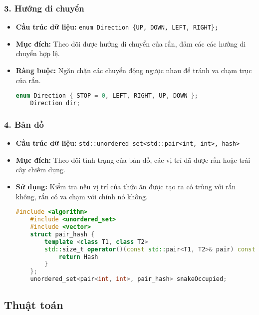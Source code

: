 \documentclass[12pt]{report}
\begin{document}
\subsubsection*{3. Hướng di chuyển}
\begin{itemize}
    \item \textbf{Cầu trúc dữ liệu:} \texttt{enum Direction \{UP, DOWN, LEFT, RIGHT\};}
    \item \textbf{Mục đích:} Theo dõi được hướng di chuyển của rắn, đảm các các hướng di chuyển hợp lệ.
    \item \textbf{Ràng buộc:} Ngăn chặn các chuyển động ngược nhau để tránh va chạm trục của rắn.
          \begin{footnotesize}
              \begin{lstlisting}[language=C++]
    enum Direction { STOP = 0, LEFT, RIGHT, UP, DOWN };
    Direction dir;
    \end{lstlisting}
          \end{footnotesize}
\end{itemize}

\subsubsection*{4. Bản đồ}
\begin{itemize}
    \item \textbf{Cầu trúc dữ liệu:} \texttt{std::unordered\_set<std::pair<int, int>, hash>}
    \item \textbf{Mục đích:} Theo dõi tình trạng của bản đồ, các vị trí đã dược rắn hoặc trái cây chiếm dụng.
    \item \textbf{Sử dụng:} Kiểm tra nếu vị trí của thức ăn được tạo ra có trùng với rắn không, rắn có va chạm với chính nó không.
          \begin{footnotesize}
              \begin{lstlisting}[language=C++]
    #include <algorithm>
    #include <unordered_set>
    #include <vector>
    struct pair_hash {
        template <class T1, class T2>
        std::size_t operator()(const std::pair<T1, T2>& pair) const {
            return Hash
        }
    };
    unordered_set<pair<int, int>, pair_hash> snakeOccupied;
    \end{lstlisting}
          \end{footnotesize}
\end{itemize}

\subsection*{Thuật toán}
\end{document}
